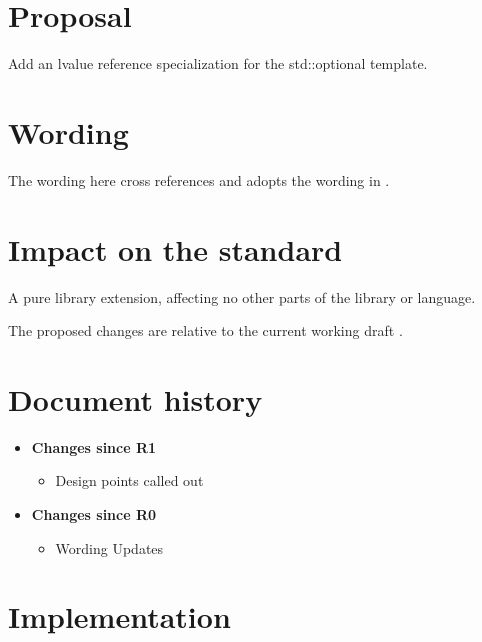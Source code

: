 \documentclass[a4paper,10pt,oneside,openany,final,article]{memoir}
\begin{document}
\chapter{Proposal}

Add an lvalue reference specialization for the std::optional template.

\chapter{Wording}

The wording here cross references and adopts the wording in \cite{P3091R2}.


\begin{wording}



\end{wording}

\chapter{Impact on the standard}

A pure library extension, affecting no other parts of the library or language.

The proposed changes are relative to the current working draft \cite{N4910}.

\chapter*{Document history}

\begin{itemize}
\item \textbf{Changes since R1}
  \begin{itemize}
  \item Design points called out
  \end{itemize}
\item \textbf{Changes since R0}
  \begin{itemize}
  \item Wording Updates
  \end{itemize}
\end{itemize}

\renewcommand{\bibname}{References}




\backmatter
\chapter*{Implementation}
\end{document}
